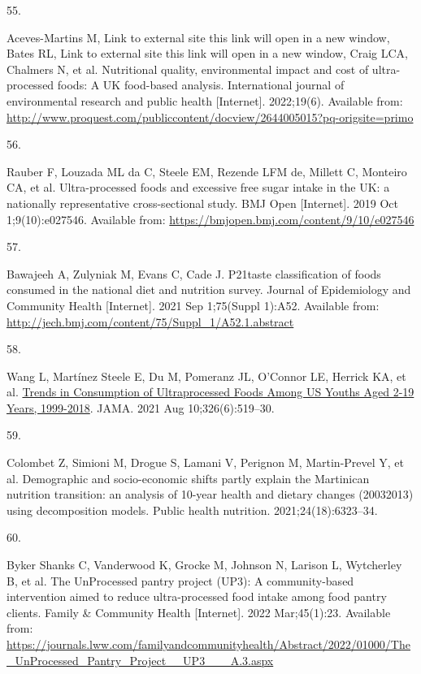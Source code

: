 \documentclass[
]{article}
\newlength{\cslhangindent}
\newlength{\csllabelwidth}
\newlength{\cslentryspacingunit} %
\newenvironment{CSLReferences}[2] %
 {%
  \setlength{\parindent}{0pt}
  \ifodd #1
  \let\oldpar\par
  \def\par{\hangindent=\cslhangindent\oldpar}
  \fi
  \setlength{\parskip}{#2\cslentryspacingunit}
 }%
 {}
\newcommand{\CSLLeftMargin}[1]{\parbox[t]{\csllabelwidth}{#1}}
\newcommand{\CSLRightInline}[1]{\parbox[t]{\linewidth - \csllabelwidth}{#1}\break}
\begin{document}
\begin{CSLReferences}{0}{0}
\leavevmode{}%
\CSLLeftMargin{55. }%
\CSLRightInline{Aceves-Martins M, Link to external site this link will
open in a new window, Bates RL, Link to external site this link will
open in a new window, Craig LCA, Chalmers N, et al. Nutritional quality,
environmental impact and cost of ultra-processed foods: A UK food-based
analysis. International journal of environmental research and public
health {[}Internet{]}. 2022;19(6). Available from:
\url{http://www.proquest.com/publiccontent/docview/2644005015?pq-origsite=primo}}

\leavevmode{}%
\CSLLeftMargin{56. }%
\CSLRightInline{Rauber F, Louzada ML da C, Steele EM, Rezende LFM de,
Millett C, Monteiro CA, et al. Ultra-processed foods and excessive free
sugar intake in the UK: a nationally representative cross-sectional
study. BMJ Open {[}Internet{]}. 2019 Oct 1;9(10):e027546. Available
from: \url{https://bmjopen.bmj.com/content/9/10/e027546}}

\leavevmode{}%
\CSLLeftMargin{57. }%
\CSLRightInline{Bawajeeh A, Zulyniak M, Evans C, Cade J.
P21{\hspace{0.25em}}taste classification of foods consumed in the
national diet and nutrition survey. Journal of Epidemiology and
Community Health {[}Internet{]}. 2021 Sep 1;75(Suppl 1):A52. Available
from: \url{http://jech.bmj.com/content/75/Suppl_1/A52.1.abstract}}

\leavevmode{}%
\CSLLeftMargin{58. }%
\CSLRightInline{Wang L, Martínez Steele E, Du M, Pomeranz JL, O'Connor
LE, Herrick KA, et al.
\href{https://doi.org/10.1001/jama.2021.10238}{Trends in Consumption of
Ultraprocessed Foods Among US Youths Aged 2-19 Years, 1999-2018}. JAMA.
2021 Aug 10;326(6):519--30. }

\leavevmode{}%
\CSLLeftMargin{59. }%
\CSLRightInline{Colombet Z, Simioni M, Drogue S, Lamani V, Perignon M,
Martin-Prevel Y, et al. Demographic and socio-economic shifts partly
explain the Martinican nutrition transition: an analysis of 10-year
health and dietary changes (2003{\textendash}2013) using decomposition
models. Public health nutrition. 2021;24(18):6323--34. }

\leavevmode{}%
\CSLLeftMargin{60. }%
\CSLRightInline{Byker Shanks C, Vanderwood K, Grocke M, Johnson N,
Larison L, Wytcherley B, et al. The UnProcessed pantry project (UP3): A
community-based intervention aimed to reduce ultra-processed food intake
among food pantry clients. Family \& Community Health {[}Internet{]}.
2022 Mar;45(1):23. Available from:
\url{https://journals.lww.com/familyandcommunityhealth/Abstract/2022/01000/The_UnProcessed_Pantry_Project__UP3___A.3.aspx}}


\end{CSLReferences}
\end{document}
